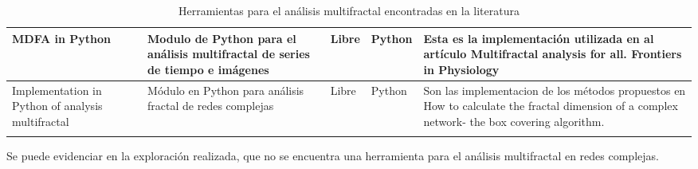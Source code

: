 \begin{longtable}{|p{3cm}|p{4cm}|p{2cm}|p{2cm}|p{4cm}|}
    \hline
    MDFA in Python\cite{pythonMFDA} & Modulo de Python para el análisis multifractal de series de tiempo e imágenes & Libre & Python & Esta es la implementación utilizada en al artículo Multifractal analysis for all. Frontiers in Physiology\cite{Jurica2015} \\
    \hline
    Implementation in Python of analysis multifractal\cite{pythonFractal} & Módulo en Python para análisis fractal de redes complejas & Libre & Python & Son las implementacion de los métodos propuestos en How to calculate the fractal dimension of a complex network- the box covering algorithm\cite{Song2007}.\\
    \hline
\caption{Herramientas para el análisis multifractal encontradas en la literatura}
\label{tab:herramientasFractal}
\end{longtable}

Se puede evidenciar en la exploración realizada, que no se encuentra una herramienta para el análisis multifractal en redes complejas.